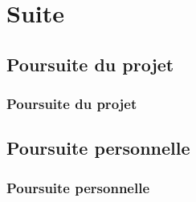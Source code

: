 \documentclass{beamer}
\begin{document}
\section{Suite}

\subsection{Poursuite du projet}
\begin{frame}
\frametitle{Poursuite du projet}
\end{frame}

\subsection{Poursuite personnelle}
\begin{frame}
\frametitle{Poursuite personnelle}
\end{frame}

\end{document}
